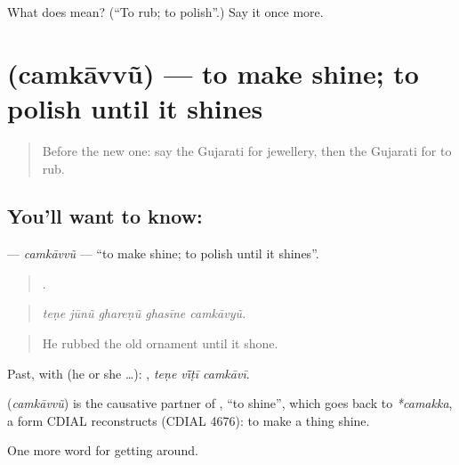 \begin{tcolorbox}[breakable,colback=teal!4,colframe=teal!35!black,title={Before you move on}]
What does  mean? (\textquotedblleft{}To rub; to polish\textquotedblright{}.) Say it once more.
\end{tcolorbox}
\section[\texorpdfstring{\gu{ચમકાવવું} (camkāvvũ)}{ચમકાવવું (camkāvvũ)}]{ (camkāvvũ) — to make shine; to polish until it shines}

\label{lesson:GU-C432-camkavvu}



\begin{quote}
Before the new one: say the Gujarati for jewellery, then the Gujarati for to rub.
\end{quote}

\subsection*{You'll want to know: }
\textbf{} — \emph{camkāvvũ} — \textquotedblleft{}to make shine; to polish until it shines\textquotedblright{}.

\begin{quote}
    .
\end{quote}

\begin{quote}
\emph{teṇe jūnũ ghareṇũ ghasīne camkāvyũ.}
\end{quote}

\begin{quote}
He rubbed the old ornament until it shone.
\end{quote}

Past, with  (he or she …):   , \emph{teṇe vī̃ṭī camkāvī}.

\begin{cousinweb}
\textbf{} (\emph{camkāvvũ}) is the causative partner of , \textquotedblleft{}to shine\textquotedblright{}, which goes back to \emph{*camakka}, a form CDIAL reconstructs (CDIAL 4676): to make a thing shine.
\end{cousinweb}

\begin{grammarlens}[title={What you've built}]
One more word for getting around.
\end{grammarlens}

